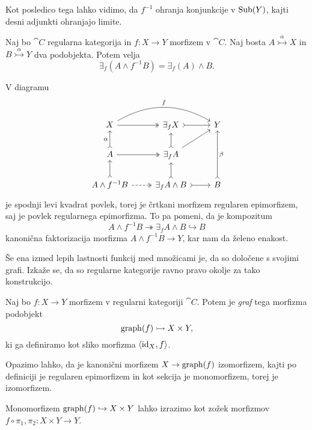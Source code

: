 \documentclass[../kategoricna_logika.tex]{subfiles}
\begin{document}
\noindent
Kot posledico tega lahko vidimo, da $f^{-1}$ ohranja konjunkcije v
$\operatorname{Sub}(Y)$, kajti desni adjunkti ohranjajo limite.
\begin{lema}\label{lema:frobeniusova-lema}
  Naj bo $\cat{C}$ regularna kategorija in ${f : X \to Y}$ morfizem v
  $\cat{C}$.  Naj bosta $A \overset{\alpha}{\rightarrowtail} X$ in
  $B \overset{\alpha}{\rightarrowtail} Y$ dva podobjekta.  Potem velja
  $$\exists_f(A \wedge f^{-1}B) = \exists_f(A) \wedge B.$$
\end{lema}
\begin{dokaz}
  V diagramu
  \begin{equation*}
    \begin{tikzcd}
      X \ar[rr, bend left, "f"] \ar[r, two heads] & \exists_f X \ar[r, tail] & Y \\
      A \ar[u, tail, "\alpha"] \ar[r, two heads] & \exists_f A \ar[u, tail] \ar[ur] & \\
      A \land f^{-1}B \ar[u, tail] \ar[r, dashed, two heads] &
      \exists_f A \land B \ar[r, tail] \ar[u, tail] & B \ar[uu, tail,
      "\beta"']
    \end{tikzcd}
  \end{equation*}
  je spodnji levi kvadrat povlek, torej je črtkani morfizem regularen
  epimorfizem, saj je povlek regularnega epimorfizma.  To pa pomeni,
  da je kompozitum
  \[A \land f^{-1}B \twoheadrightarrow \exists_f A \land B
    \hookrightarrow B\] kanonična faktorizacija morfizma
  $A \land f^{-1}B \to Y$, kar nam da želeno enakost.
\end{dokaz}
Še ena izmed lepih lastnosti funkcij med množicami je, da so
določene s svojimi grafi.  Izkaže se, da so regularne kategorije ravno
pravo okolje za tako konstrukcijo.
\begin{definicija}\label{definicija:graf-morfizma}
  Naj bo $f : X \to Y$ morfizem v regularni kategoriji
  $\cat{C}$. Potem je \emph{graf} tega morfizma podobjekt
  $$\operatorname{graph}(f) \rightarrowtail X \times Y,$$
  ki ga definiramo kot sliko morfizma $\langle \mathrm{id}_X, f \rangle$.
\end{definicija}
Opazimo lahko, da je kanonični morfizem $X \to \operatorname{graph}(f)$ izomorfizem,
kajti po definiciji je regularen epimorfizem in kot sekcija je
monomorfizem, torej je izomorfizem.
\begin{lema}\label{lema:graf-kot-zozek}
  Monomorfizem $\operatorname{graph}(f) \hookrightarrow X \times Y$ lahko izrazimo
  kot zožek morfizmov $f\circ \pi_1, \pi_2 : X \times Y \to Y$.
\end{lema}
\end{document}
